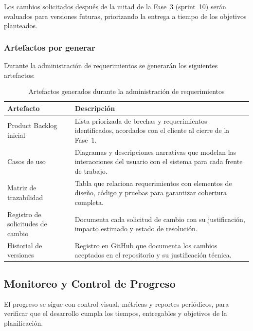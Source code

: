 \documentclass{article}
\begin{document}
Los cambios solicitados después de la mitad de la Fase~3 (sprint~10) serán
evaluados para versiones futuras, priorizando la entrega a tiempo de los
objetivos planteados.

\subsubsection*{Artefactos por generar}

Durante la administración de requerimientos se generarán los siguientes
artefactos:

\begin{table}[!ht]
\centering
\small
\begin{tabular}{|p{4cm}|p{10cm}|}
\hline
\textbf{Artefacto} & \textbf{Descripción} \\ \hline

Product Backlog inicial & Lista priorizada de brechas y requerimientos identificados, acordados con el cliente al cierre de la Fase~1. \\ \hline

Casos de uso & Diagramas y descripciones narrativas que modelan las interacciones del usuario con el sistema para cada frente de trabajo. \\ \hline

Matriz de trazabilidad & Tabla que relaciona requerimientos con elementos de diseño, código y pruebas para garantizar cobertura completa. \\ \hline

Registro de solicitudes de cambio & Documenta cada solicitud de cambio con su justificación, impacto estimado y estado de resolución. \\ \hline

Historial de versiones & Registro en GitHub que documenta los cambios aceptados en el repositorio y su justificación técnica. \\ \hline

\end{tabular}
\caption{Artefactos generados durante la administración de requerimientos}
\label{tab:artefactos_requerimientos}
\end{table}

\subsection{Monitoreo y Control de Progreso}

El progreso se sigue con control visual, métricas y reportes periódicos, para
verificar que el desarrollo cumpla los tiempos, entregables y objetivos de la
planificación.
\end{document}

